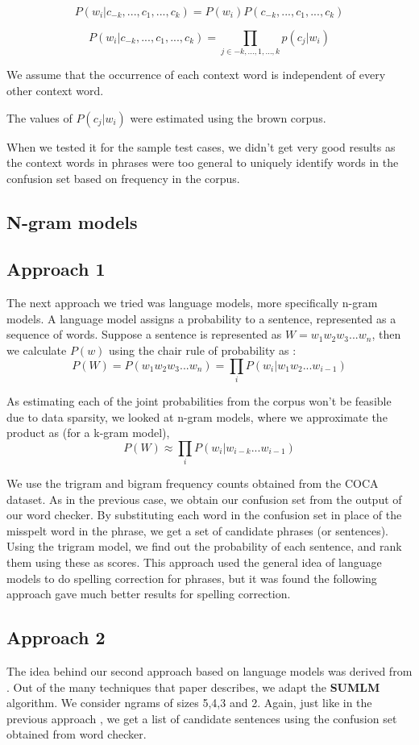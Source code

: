 \[P(w_i|c_{-k},...,c_{1},...,c_{k}) = P(w_i) P(c_{-k},...,c_{1},...,c_{k})\]

\[P(w_i|c_{-k},...,c_{1},...,c_{k}) = \prod_{j \in -k,...,1,...,k} p(c_j|w_i) \]

We assume that the occurrence of each context word is independent of every other context word.

The values of $P(c_j|w_i)$ were estimated using the brown corpus.

When we tested it for the sample test cases, we didn't get very good results as the context words in phrases were too general to uniquely identify words in the confusion set based on frequency in the corpus.

\subsection{N-gram models}
\subsection*{Approach 1}
The next approach we tried was language models, more specifically n-gram models. A language model assigns a probability to a sentence, represented as a sequence of words. Suppose a sentence is represented as $W = w_1w_2w_3...w_n$, then we calculate $P(w)$ using the chair rule of probability as :
\[P(W) = P(w_1w_2w_3...w_n) = \prod_i P(w_i|w_1w_2...w_{i-1})\]

As estimating each of the joint probabilities from the corpus won't be feasible due to data sparsity, we looked at n-gram models, where we approximate the product as (for a k-gram model),
\[P(W) \approx \prod_i P(w_i|w_{i-k}...w_{i-1}) \]

We use the trigram and bigram frequency counts obtained from the COCA dataset.
As in the previous case, we obtain our confusion set from the output of our word checker. By substituting each word in the confusion set in place of the misspelt word in the phrase, we get a set of candidate phrases (or sentences). 
Using the trigram model, we find out the probability of each sentence, and rank them using these as scores.  This approach used the general idea of language models to do spelling correction for phrases, but it was found the following approach gave much better results for spelling correction.


\subsection*{Approach 2}
The idea behind our second approach based on language models was derived from \cite{bergsma}.
Out of the many techniques that paper describes, we adapt the \textbf{SUMLM} algorithm. 
We consider ngrams of sizes 5,4,3 and 2. Again, just like in the previous approach , we get a list of candidate sentences using the confusion set obtained from word checker.

